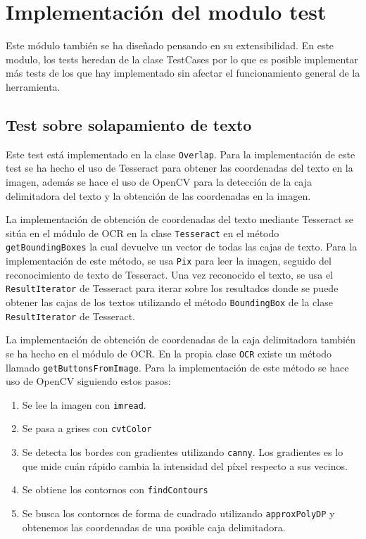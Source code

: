 \section{Implementación del modulo test}
\label{sec:Implementación de los tests}

Este módulo también se ha diseñado pensando en su extensibilidad.
En este modulo, los tests heredan de la clase TestCases por lo que es posible implementar más tests de los que hay implementado sin afectar el funcionamiento general de la herramienta.
\subsection{Test sobre solapamiento de texto}
\label{itest:overlap}
Este test está implementado en la clase \texttt{Overlap}.
Para la implementación de este test se ha hecho el uso de Tesseract para obtener las coordenadas del texto en la imagen, además se hace el uso de OpenCV para la detección de la caja delimitadora del texto y la obtención de las coordenadas en la imagen.

La implementación de obtención de coordenadas del texto mediante Tesseract se sitúa en el módulo de OCR en la clase \texttt{Tesseract} en el método \texttt{getBoundingBoxes} la cual devuelve un vector de todas las cajas de texto. Para la implementación de este método, se usa \texttt{Pix} para leer la imagen, seguido del reconocimiento de texto de Tesseract. Una vez reconocido el texto, se usa el \texttt{ResultIterator} de Tesseract para iterar sobre los resultados donde se puede obtener las cajas de los textos utilizando el método \texttt{BoundingBox} de la clase \texttt{ResultIterator} de Tesseract.

La implementación de obtención de coordenadas de la caja delimitadora también se ha hecho en el módulo de OCR. En la propia clase \texttt{OCR} existe un método llamado \texttt{getButtonsFromImage}. Para la implementación de este método se hace uso de OpenCV siguiendo estos pasos:
\begin{enumerate}
	\item Se lee la imagen con \texttt{imread}.
	\item Se pasa a grises con \texttt{cvtColor}
	\item Se detecta los bordes con gradientes utilizando \texttt{canny}. Los gradientes es lo que mide cuán rápido cambia la intensidad del píxel respecto a sus vecinos.
	\item Se obtiene los contornos con \texttt{findContours}
	\item Se busca los contornos de forma de cuadrado utilizando \texttt{approxPolyDP} y obtenemos las coordenadas de una posible caja delimitadora.
\end{enumerate}

